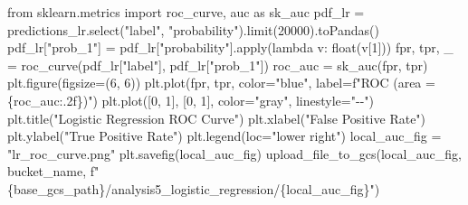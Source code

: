 \documentclass[
  letterpaper,
  DIV=11,
  numbers=noendperiod]{scrartcl}
\newenvironment{Shaded}{\begin{snugshade}}{\end{snugshade}}
\newcommand{\BuiltInTok}[1]{\textcolor[rgb]{0.98,0.46,0.51}{#1}}
\newcommand{\DecValTok}[1]{\textcolor[rgb]{0.47,0.72,1.00}{#1}}
\newcommand{\ImportTok}[1]{\textcolor[rgb]{0.62,0.80,1.00}{#1}}
\newcommand{\KeywordTok}[1]{\textcolor[rgb]{0.98,0.46,0.51}{#1}}
\newcommand{\NormalTok}[1]{\textcolor[rgb]{0.88,0.89,0.91}{#1}}
\newcommand{\OperatorTok}[1]{\textcolor[rgb]{0.88,0.89,0.91}{#1}}
\newcommand{\SpecialCharTok}[1]{\textcolor[rgb]{0.47,0.72,1.00}{#1}}
\newcommand{\SpecialStringTok}[1]{\textcolor[rgb]{0.62,0.80,1.00}{#1}}
\newcommand{\StringTok}[1]{\textcolor[rgb]{0.62,0.80,1.00}{#1}}
\begin{document}
\begin{Shaded}
\begin{Highlighting}[]
    \ImportTok{from}\NormalTok{ sklearn.metrics }\ImportTok{import}\NormalTok{ roc\_curve, auc }\ImportTok{as}\NormalTok{ sk\_auc}
\NormalTok{    pdf\_lr }\OperatorTok{=}\NormalTok{ predictions\_lr.select(}\StringTok{"label"}\NormalTok{, }\StringTok{"probability"}\NormalTok{).limit(}\DecValTok{20000}\NormalTok{).toPandas()}
\NormalTok{    pdf\_lr[}\StringTok{"prob\_1"}\NormalTok{] }\OperatorTok{=}\NormalTok{ pdf\_lr[}\StringTok{"probability"}\NormalTok{].}\BuiltInTok{apply}\NormalTok{(}\KeywordTok{lambda}\NormalTok{ v: }\BuiltInTok{float}\NormalTok{(v[}\DecValTok{1}\NormalTok{]))}
\NormalTok{    fpr, tpr, \_ }\OperatorTok{=}\NormalTok{ roc\_curve(pdf\_lr[}\StringTok{"label"}\NormalTok{], pdf\_lr[}\StringTok{"prob\_1"}\NormalTok{])}
\NormalTok{    roc\_auc }\OperatorTok{=}\NormalTok{ sk\_auc(fpr, tpr)}
\NormalTok{    plt.figure(figsize}\OperatorTok{=}\NormalTok{(}\DecValTok{6}\NormalTok{, }\DecValTok{6}\NormalTok{))}
\NormalTok{    plt.plot(fpr, tpr, color}\OperatorTok{=}\StringTok{"blue"}\NormalTok{, label}\OperatorTok{=}\SpecialStringTok{f"ROC (area = }\SpecialCharTok{\{}\NormalTok{roc\_auc}\SpecialCharTok{:.2f\}}\SpecialStringTok{)"}\NormalTok{)}
\NormalTok{    plt.plot([}\DecValTok{0}\NormalTok{, }\DecValTok{1}\NormalTok{], [}\DecValTok{0}\NormalTok{, }\DecValTok{1}\NormalTok{], color}\OperatorTok{=}\StringTok{"gray"}\NormalTok{, linestyle}\OperatorTok{=}\StringTok{"{-}{-}"}\NormalTok{)}
\NormalTok{    plt.title(}\StringTok{"Logistic Regression ROC Curve"}\NormalTok{)}
\NormalTok{    plt.xlabel(}\StringTok{"False Positive Rate"}\NormalTok{)}
\NormalTok{    plt.ylabel(}\StringTok{"True Positive Rate"}\NormalTok{)}
\NormalTok{    plt.legend(loc}\OperatorTok{=}\StringTok{"lower right"}\NormalTok{)}
\NormalTok{    local\_auc\_fig }\OperatorTok{=} \StringTok{"lr\_roc\_curve.png"}
\NormalTok{    plt.savefig(local\_auc\_fig)}
\NormalTok{    upload\_file\_to\_gcs(local\_auc\_fig, bucket\_name, }\SpecialStringTok{f"}\SpecialCharTok{\{}\NormalTok{base\_gcs\_path}\SpecialCharTok{\}}\SpecialStringTok{/analysis5\_logistic\_regression/}\SpecialCharTok{\{}\NormalTok{local\_auc\_fig}\SpecialCharTok{\}}\SpecialStringTok{"}\NormalTok{)}


\end{Highlighting}
\end{Shaded}
\end{document}
